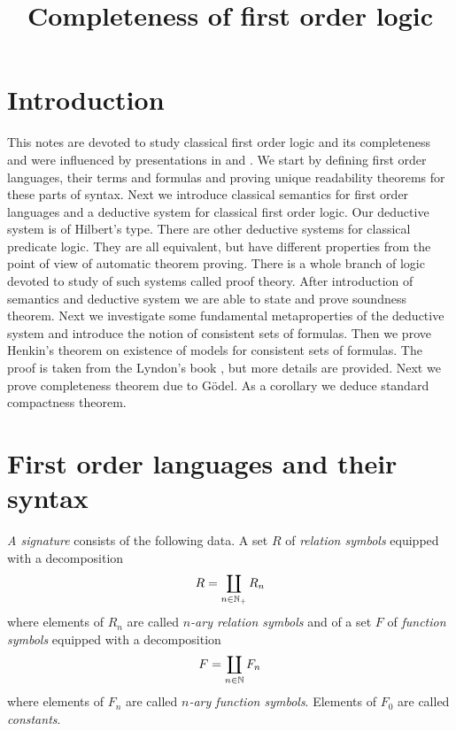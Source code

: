 



\title{Completeness of first order logic}
\date{}
\maketitle

\section{Introduction}
\noindent
This notes are devoted to study classical first order logic and its completeness and were influenced by presentations in \cite{enderton2001mathematical} and \cite{lyndon1966notes}. We start by defining first order languages, their terms and formulas and proving unique readability theorems for these parts of syntax. Next we introduce classical semantics for first order languages and a deductive system for classical first order logic. Our deductive system is of Hilbert’s type. There are other deductive systems for classical predicate logic. They are all equivalent, but have different properties from the point of view of automatic theorem proving. There is a whole branch of logic devoted to study of such systems called proof theory. After introduction of semantics and deductive system we are able to state and prove soundness theorem. Next we investigate some fundamental metaproperties of the deductive system and introduce the notion of consistent sets of formulas. Then we prove Henkin’s theorem on existence of models for consistent sets of formulas. The proof is taken from the Lyndon’s book \cite{lyndon1966notes}, but more details are provided. Next we prove completeness theorem due to Gödel. As a corollary we deduce standard compactness theorem.

\section{First order languages and their syntax}

\begin{definition}
\textit{A signature} consists of the following data. A set $R$ of \textit{relation symbols} equipped with a decomposition
$$R = \coprod_{n\in {\mathbb N}_+}R_n$$
where elements of $R_n$ are called \textit{$n$-ary relation symbols} and of a set $F$ of \textit{function symbols} equipped with a decomposition
$$F = \coprod_{n\in {\mathbb N}}F_n$$
where elements of $F_n$ are called \textit{$n$-ary function symbols}. Elements of $F_0$ are called \textit{constants}.
\end{definition}

